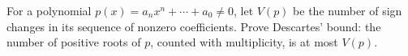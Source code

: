 For a polynomial $p(x)=a_nx^n+\cdots+a_0\ne0$, let $V(p)$ be the number of sign changes in its sequence of nonzero coefficients. Prove Descartes' bound: the number of positive roots of $p$, counted with multiplicity, is at most $V(p)$.

